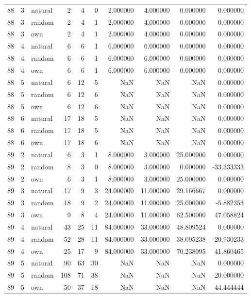 \begin{table}[htbp]
\begin{tabular}{rrlrrrrrrr}
88 & 3 & natural & 2 & 4 & 0 & 2.000000 & 4.000000 & 0.000000 & 0.000000 \\
88 & 3 & random & 2 & 4 & 1 & 2.000000 & 4.000000 & 0.000000 & 0.000000 \\
88 & 3 & own & 2 & 4 & 1 & 2.000000 & 4.000000 & 0.000000 & 0.000000 \\
88 & 4 & natural & 6 & 6 & 1 & 6.000000 & 6.000000 & 0.000000 & 0.000000 \\
88 & 4 & random & 6 & 6 & 1 & 6.000000 & 6.000000 & 0.000000 & 0.000000 \\
88 & 4 & own & 6 & 6 & 1 & 6.000000 & 6.000000 & 0.000000 & 0.000000 \\
88 & 5 & natural & 6 & 12 & 5 & NaN & NaN & NaN & 0.000000 \\
88 & 5 & random & 6 & 12 & 6 & NaN & NaN & NaN & 0.000000 \\
88 & 5 & own & 6 & 12 & 6 & NaN & NaN & NaN & 0.000000 \\
88 & 6 & natural & 17 & 18 & 5 & NaN & NaN & NaN & 0.000000 \\
88 & 6 & random & 17 & 18 & 5 & NaN & NaN & NaN & 0.000000 \\
88 & 6 & own & 17 & 18 & 6 & NaN & NaN & NaN & 0.000000 \\
89 & 2 & natural & 6 & 3 & 1 & 8.000000 & 3.000000 & 25.000000 & 0.000000 \\
89 & 2 & random & 8 & 3 & 0 & 8.000000 & 3.000000 & 0.000000 & -33.333333 \\
89 & 2 & own & 6 & 3 & 1 & 8.000000 & 3.000000 & 25.000000 & 0.000000 \\
89 & 3 & natural & 17 & 9 & 3 & 24.000000 & 11.000000 & 29.166667 & 0.000000 \\
89 & 3 & random & 18 & 9 & 2 & 24.000000 & 11.000000 & 25.000000 & -5.882353 \\
89 & 3 & own & 9 & 8 & 4 & 24.000000 & 11.000000 & 62.500000 & 47.058824 \\
89 & 4 & natural & 43 & 25 & 11 & 84.000000 & 33.000000 & 48.809524 & 0.000000 \\
89 & 4 & random & 52 & 28 & 11 & 84.000000 & 33.000000 & 38.095238 & -20.930233 \\
89 & 4 & own & 25 & 17 & 9 & 84.000000 & 33.000000 & 70.238095 & 41.860465 \\
89 & 5 & natural & 90 & 63 & 30 & NaN & NaN & NaN & 0.000000 \\
89 & 5 & random & 108 & 71 & 38 & NaN & NaN & NaN & -20.000000 \\
89 & 5 & own & 50 & 37 & 18 & NaN & NaN & NaN & 44.444444 \\

\end{tabular}
\end{table}

